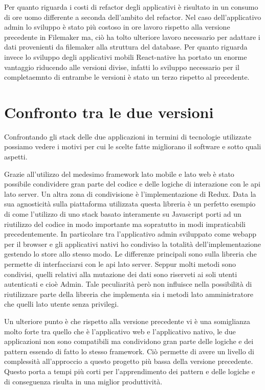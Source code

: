 Per quanto riguarda i costi di refactor degli applicativi è risultato in un consumo di ore uomo differente a seconda dell'ambito del refactor. Nel caso dell'applicativo admin lo sviluppo è stato più costoso in ore lavoro rispetto alla versione precedente in Filemaker ma, ciò ha tolto ulteriore lavoro necessario per adattare i dati provenienti da filemaker alla struttura del database. Per quanto riguarda invece lo sviluppo degli applicativi mobili React-native ha portato un enorme vantaggio riducendo alle versioni divise, infatti lo sviluppo necessario per il completaemnto di entrambe le versioni è stato un terzo rispetto al precedente.\vspace{5mm}  

\section{Confronto tra le due versioni}\vspace{5mm}  

Confrontando gli stack delle due applicazioni in termini di tecnologie utilizzate possiamo vedere i motivi per cui le scelte fatte migliorano il software e sotto quali aspetti. \vspace{5mm}

Grazie all'utilizzo del medesimo framework lato mobile e lato web è stato possibile condividere gran parte del codice e delle logiche di interazione con le api lato server. Un altra zona di condivisione è l'implementazione di Redux. Data la sua agnosticità sulla piattaforma utilizzata questa libreria è un perfetto esempio di come l'utilizzo di uno stack basato interamente su Javascript porti ad un riutilizzo del codice in modo importante ma sopratutto in modi impraticabili precedentemente. In particolare tra l’applicativo admin sviluppato come webapp per il browser e gli applicativi nativi ho condiviso la totalità dell’implementazione gestendo lo store allo stesso modo. Le differenze principali sono sulla libreria che permette di interfacciarsi con le api lato server. Seppur molti metodi sono condivisi, quelli relativi alla mutazione dei dati sono riserveti ai soli utenti autenticati e cioè Admin. Tale peculiarità però non influisce nella possibilità di riutilizzare parte della libreria che implementa sia i metodi lato amministratore che quelli lato utente senza privilegi.\vspace{5mm} 

Un ulteriore punto è che rispetto alla versione precedente vi è una somiglianza molto forte tra quello che è l’applicativo web e l’applicativo nativo, le due applicazioni non sono compatibili ma condividono gran parte delle logiche e dei pattern essendo di fatto lo stesso framework. Ciò permette di avere un livello di complessità all'approccio a questo progetto più bassa della versione precedente. Questo porta a tempi più corti per l'apprendimento dei pattern e delle logiche e di conseguenza risulta in una miglior produttività.\vspace{5mm}
	
